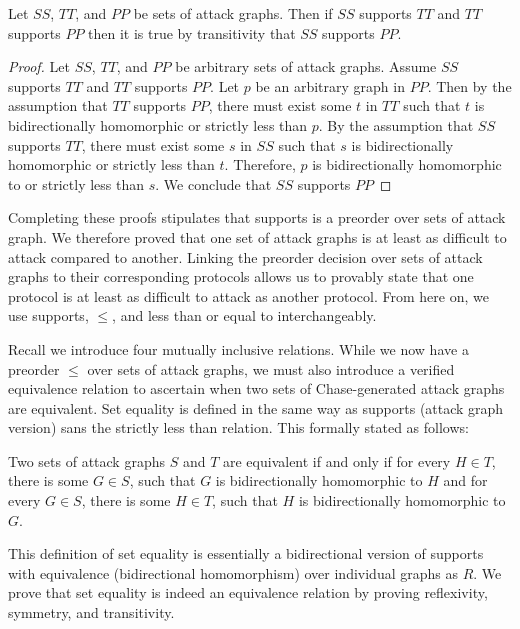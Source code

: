 \documentclass[runningheads]{llncs}
\theoremstyle{definition}
\begin{document}
\begin{theorem}
    Let $SS$, $TT$, and $PP$ be sets of attack graphs. Then if $SS$ supports $TT$ and $TT$ supports $PP$ then it is true by transitivity that $SS$ supports $PP$. 
\end{theorem}
\begin{proof}
    Let $SS$, $TT$, and $PP$ be arbitrary sets of attack graphs. Assume $SS$ supports $TT$ and $TT$ supports $PP$. Let $p$ be an arbitrary graph in $PP$. Then by the assumption that $TT$ supports $PP$, there must exist some $t$ in $TT$ such that $t$ is bidirectionally homomorphic or strictly less than $p$. By the assumption that $SS$ supports $TT$, there must exist some $s$ in $SS$ such that $s$ is bidirectionally homomorphic or strictly less than $t$. Therefore, $p$ is bidirectionally homomorphic to or strictly less than $s$. We conclude that $SS$ supports $PP$
\end{proof}

\noindent Completing these proofs stipulates that supports is a preorder over sets of attack graph. We therefore proved that one set of attack graphs is at least as difficult to attack compared to another. Linking the preorder decision over sets of attack graphs to their corresponding protocols allows us to provably state that one protocol is at least as difficult to attack as another protocol. From here on, we use supports, $\leq$, and less than or equal to interchangeably. 

Recall we introduce four mutually inclusive relations. While we now have a preorder $\leq$ over sets of attack graphs, we must also introduce a verified equivalence relation to ascertain when two sets of Chase-generated attack graphs are equivalent. Set equality is defined in the same way as supports (attack graph version) sans the strictly less than relation. This formally stated as follows: 

\begin{definition}
    Two sets of attack graphs $S$ and $T$ are equivalent if and only if for every $H \in T$, there is some $G \in S$, such that $G$ is bidirectionally homomorphic to $H$ and for every $G \in S$, there is some $H \in T$, such that $H$ is bidirectionally homomorphic to $G$.
\end{definition}

This definition of set equality is essentially a bidirectional version of supports with equivalence (bidirectional homomorphism) over individual graphs as $R$. We prove that set equality is indeed an equivalence relation by proving reflexivity, symmetry, and transitivity. 
\end{document}
